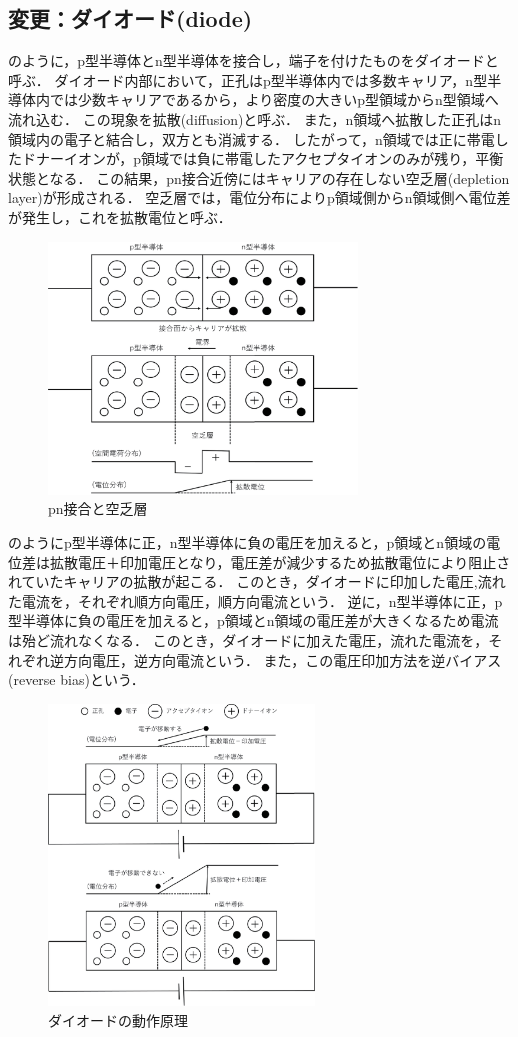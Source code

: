 \subsection{変更：ダイオード(diode)}
のように，p型半導体とn型半導体を接合し，端子を付けたものをダイオードと呼ぶ．
ダイオード内部において，正孔はp型半導体内では多数キャリア，n型半導体内では少数キャリアであるから，より密度の大きいp型領域からn型領域へ流れ込む．
この現象を拡散(diffusion)と呼ぶ．
また，n領域へ拡散した正孔はn領域内の電子と結合し，双方とも消滅する．
したがって，n領域では正に帯電したドナーイオンが，p領域では負に帯電したアクセプタイオンのみが残り，平衡状態となる．
この結果，pn接合近傍にはキャリアの存在しない空乏層(depletion layer)が形成される．
空乏層では，電位分布によりp領域側からn領域側へ電位差が発生し，これを拡散電位と呼ぶ．

\begin{figure}[!h]
 \centering
 \includegraphics[width=8.2cm]{./fig/fig1.eps}
 \caption{pn接合と空乏層}
 \label{fig:fig1}
\end{figure}%

のようにp型半導体に正，n型半導体に負の電圧を加えると，p領域とn領域の電位差は拡散電圧＋印加電圧となり，電圧差が減少するため拡散電位により阻止されていたキャリアの拡散が起こる．
このとき，ダイオードに印加した電圧,流れた電流を，それぞれ順方向電圧，順方向電流という．
逆に，n型半導体に正，p型半導体に負の電圧を加えると，p領域とn領域の電圧差が大きくなるため電流は殆ど流れなくなる．
このとき，ダイオードに加えた電圧，流れた電流を，それぞれ逆方向電圧，逆方向電流という．
また，この電圧印加方法を逆バイアス(reverse bias)という．

\begin{figure}[!t]
 \centering
 \includegraphics[height=8.0cm]{./fig/fig2.eps}
 \caption{ダイオードの動作原理}
 \label{fig:fig2}
\end{figure}%


